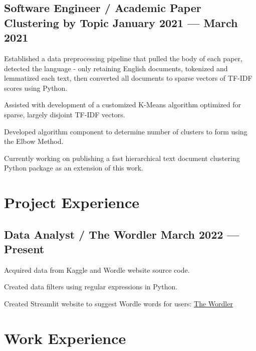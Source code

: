 \documentclass[letter,10pt]{article}
\begin{document}
\subsection{{Software Engineer / Academic Paper Clustering by Topic \hfill January 2021 --- March 2021}}
\begin{zitemize}
    \item Established a data preprocessing pipeline that pulled the body of each paper, detected the language - only retaining English documents, tokenized and lemmatized each text, then converted all documents to sparse vectors of TF-IDF scores using Python.
    \item Assisted with development of a customized K-Means algorithm optimized for sparse, largely disjoint TF-IDF vectors.
    \item Developed algorithm component to determine number of clusters to form using the Elbow Method.
    \item Currently working on publishing a fast hierarchical text document clustering Python package as an extension of this work.
\end{zitemize}

\newpage
\section{Project Experience}
\subsection{{Data Analyst / The Wordler \hfill March 2022 --- Present}}
\begin{zitemize}
    \item Acquired data from Kaggle and Wordle website source code.
    \item Created data filters using regular expressions in Python.
    \item Created Streamlit website to suggest Wordle words for users: \href{https://share.streamlit.io/middlec000/wordler/main/src/main.py}{The Wordler}
\end{zitemize}

\section{Work Experience}
\end{document}
